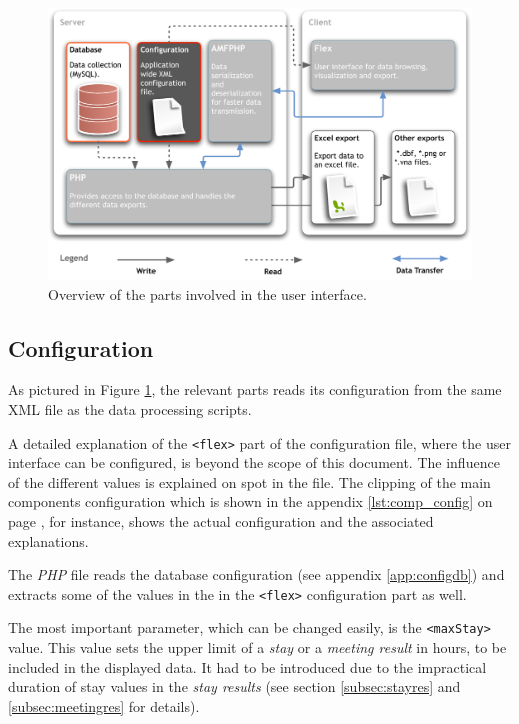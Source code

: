 \begin{figure}[htpb]
\begin{center}
  \includegraphics[width=\textwidth]{assets/pdf/application_design_miceminer.pdf}
  \caption[User interface overview]{Overview of the parts involved in the user interface.}
  \label{fig:app_design_miceminer}
\end{center}
\end{figure}

\subsection{Configuration}
\label{subsec:miceminer_config}

As pictured in Figure \ref{fig:app_design_miceminer}, the relevant parts reads its configuration from the same XML file as the data processing scripts. 

A detailed explanation of the \lstinline|<flex>| part of the configuration file, where the user interface can be configured, is beyond the scope of this document. The influence of the different values is explained on spot in the file. The clipping of the main components configuration which is shown in the appendix \ref{lst:comp_config} on page \pageref{lst:comp_config}, for instance, shows the actual configuration and the associated explanations.

The \textit{PHP} file reads the database configuration (see appendix \ref{app:configdb}) and extracts some of the values in the in the \lstinline|<flex>| configuration part as well.

The most important parameter, which can be changed easily, is the \lstinline|<maxStay>| value. This value sets the upper limit of a \textit{stay} or a \textit{meeting result} in hours, to be included in the displayed data. It had to be introduced due to the impractical duration of stay values in the \textit{stay results} (see section \ref{subsec:stayres} and \ref{subsec:meetingres} for details).   

